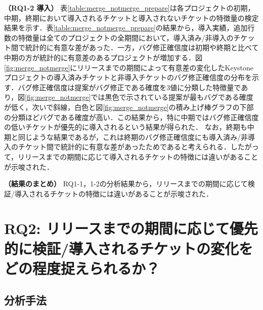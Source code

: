\documentclass[T,J]{fose} %
\newcommand{\todo}[1]{\colorbox{yellow}{{\bf TODO}:}{\color{red} {\textbf{[#1]}}}}
\newcommand{\change}[1]{\colorbox{green}{{\bf CHANGE}:}{\color{black} {\textbf{[#1]}}}}
\newcommand{\rqtwo}{リリースまでの期間に応じて優先的に検証/導入されるチケットの変化をどの程度捉えられるか？}
\begin{document}
\textbf{（RQ1-2 導入）} 表\ref{table:merge_notmerge_prepare}は各プロジェクトの初期，中期，終期において導入されるチケットと導入されないチケットの特徴量の検定結果を示す．表\ref{table:merge_notmerge_prepare}の結果から，導入実績，追加行数の特徴量は全てのプロジェクトの全期間において，導入済み/非導入のチケット間で統計的に有意な差があった．一方，バグ修正確信度は初期や終期と比べて中期の方が統計的に有意差のあるプロジェクトが増加する．図\ref{fig:merge_notmerge}にリリースまでの期間によって有意差の変化したKeystoneプロジェクトの導入済みチケットと非導入チケットのバグ修正確信度の分布を示す．バグ修正確信度は提案がバグ修正である確度を3値に分類した特徴量であり，図\ref{fig:merge_notmerge}では黒色で示されている提案が最もバグである確度が低く，次いで斜線，白色と図\ref{fig:merge_notmerge}の積み上げ棒グラフの下部の分類ほどバグである確度が高い．この結果から，特に中期ではバグ修正確信度の低いチケットが優先的に導入されるという結果が得られた．
なお，終期も中期と同じような結果であるが，これは終期のバグ修正確信度にも導入済み/非導入のチケット間で統計的に有意な差があったためであると考えられる．したがって，リリースまでの期間に応じて導入されるチケットの特徴には違いがあることが示唆された．


\textbf{（結果のまとめ）} RQ1-1，1-2の分析結果から，リリースまでの期間に応じて検証/導入されるチケットの特徴には違いがあることが示唆された．


\section{RQ2: \rqtwo}\label{sec:rq2}
\subsection{分析手法}
\end{document}
